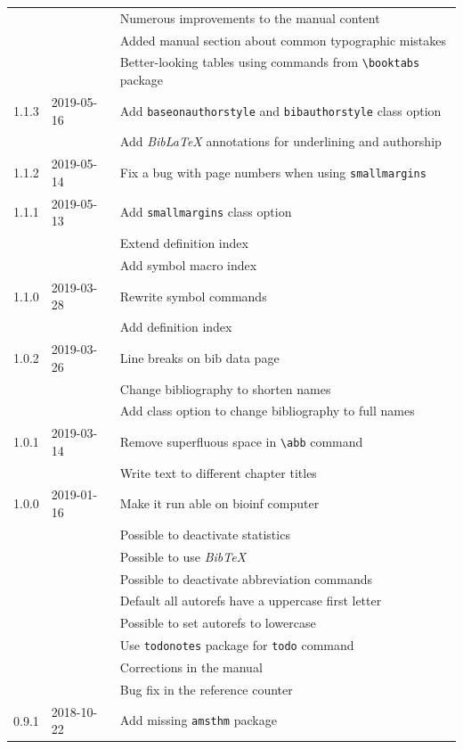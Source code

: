 \begin{longtable}{lll}
         && Numerous improvements to the manual content\\
         && Added manual section about common typographic mistakes\\
         && Better-looking tables using commands from \verb!\booktabs! package\\
    1.1.3 & 2019-05-16
          & Add \texttt{baseonauthorstyle} and \texttt{bibauthorstyle} class option\\
         && Add \emph{BibLaTeX} annotations for underlining and authorship\\
    1.1.2 & 2019-05-14
          & Fix a bug with page numbers when using \texttt{smallmargins}\\
    1.1.1 & 2019-05-13
          & Add \texttt{smallmargins} class option\\
         && Extend definition index\\
         && Add symbol macro index\\
    1.1.0 & 2019-03-28
          & Rewrite symbol commands\\
         && Add definition index\\
    1.0.2 & 2019-03-26
          & Line breaks on bib data page\\
         && Change bibliography to shorten names\\
         && Add class option to change bibliography to full names\\
    1.0.1 & 2019-03-14
          & Remove superfluous space in \verb!\abb! command\\
         && Write text to different chapter titles\\
    1.0.0 & 2019-01-16
          & Make it run able on bioinf computer\\
         && Possible to deactivate statistics\\
         && Possible to use \emph{BibTeX}\\
         && Possible to deactivate abbreviation commands\\
         && Default all autorefs have a uppercase first letter\\
         && Possible to set autorefs to lowercase\\
         && Use \texttt{todonotes} package for \texttt{todo} command\\
         && Corrections in the manual\\
         && Bug fix in the reference counter\\
    0.9.1 & 2018-10-22
          & Add missing \texttt{amsthm} package\\

\end{longtable}
